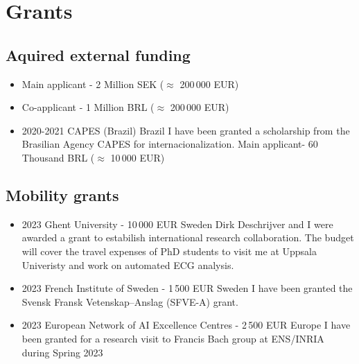 \documentclass[10pt,A4]{article} %
\begin{document}
\section{Grants}
\subsection{Aquired external funding}

\begin{itemize}
    \item {} {\small Main applicant - 2 Million SEK ($\approx$ 200\,000 EUR)}

\item {} {\small Co-applicant - 1 Million BRL ($\approx$ 200\,000 EUR)}

    \item {}
    { 2020-2021 }
    { CAPES (Brazil) }
    { Brazil }
    { I have been granted a scholarship from the Brasilian Agency CAPES for internacionalization. } {\small Main applicant-  60 Thousand BRL ($\approx$ 10\,000 EUR) }
  \end{itemize}

\subsection{Mobility grants}
\begin{itemize}
    \item {}
    { 2023 }
    { Ghent University - 10\,000 EUR }
    { Sweden }
    { Dirk Deschrijver and I were awarded a grant to estabilish international research collaboration. The budget will cover the travel expenses of PhD students to visit me at Uppsala Univeristy and work on automated ECG analysis. }
    \item {}
    { 2023 }
    { French Institute of Sweden - 1\,500 EUR }
    { Sweden }
    { I have been granted the Svensk Fransk Vetenskap–Anslag (SFVE-A) grant. }
   \item  {}
    { 2023 }
    { European Network of AI Excellence Centres - 2\,500 EUR}
    { Europe }
    { I have been granted for a research visit to Francis Bach group at ENS/INRIA during Spring 2023 }
  \end{itemize}
\end{document}
